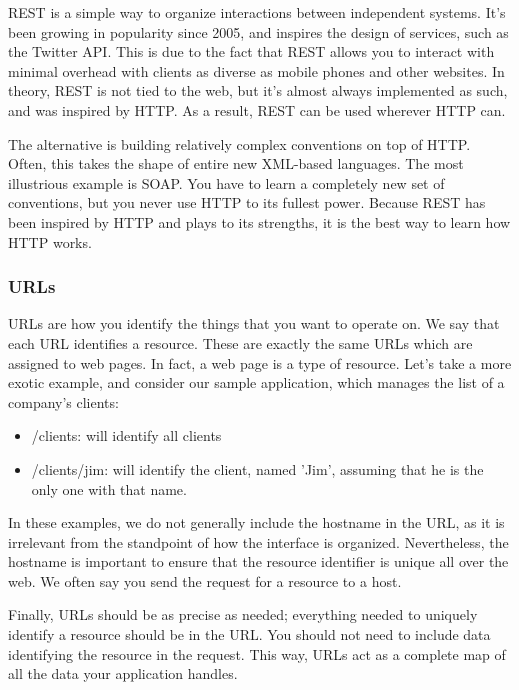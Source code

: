 REST is a simple way to organize interactions between independent systems. It's been growing in popularity since 2005, and inspires the design of services, such as the Twitter API. This is due to the fact that REST allows you to interact with minimal overhead with clients as diverse as mobile phones and other websites. In theory, REST is not tied to the web, but it's almost always implemented as such, and was inspired by HTTP. As a result, REST can be used wherever HTTP can.

The alternative is building relatively complex conventions on top of HTTP. Often, this takes the shape of entire new XML-based languages. The most illustrious example is SOAP. You have to learn a completely new set of conventions, but you never use HTTP to its fullest power. Because REST has been inspired by HTTP and plays to its strengths, it is the best way to learn how HTTP works.

\subsubsection{URLs}
URLs are how you identify the things that you want to operate on. We say that each URL identifies a resource. These are exactly the same URLs which are assigned to web pages. In fact, a web page is a type of resource. Let's take a more exotic example, and consider our sample application, which manages the list of a company's clients:

\begin{itemize}
  \item /clients: will identify all clients
  \item /clients/jim: will identify the client, named 'Jim', assuming that he is the only one with that name.
\end{itemize}



In these examples, we do not generally include the hostname in the URL, as it is irrelevant from the standpoint of how the interface is organized. Nevertheless, the hostname is important to ensure that the resource identifier is unique all over the web. We often say you send the request for a resource to a host. 

Finally, URLs should be as precise as needed; everything needed to uniquely identify a resource should be in the URL. You should not need to include data identifying the resource in the request. This way, URLs act as a complete map of all the data your application handles.

